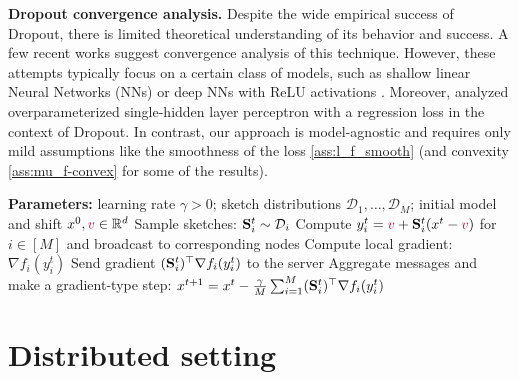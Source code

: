 \documentclass{article}
\newcommand{\shift}{{\color{purple}s}}
\newcommand{\bb}{\mathbb}
\newcommand{\R}{\bb R}
\newcommand{\cD}{\mathcal{D}}
\theoremstyle{plain}
\renewcommand{\shift}{{\color{purple}v}}
\newcommand{\mS}{{\bf S}}
\theoremstyle{plain}
\theoremstyle{definition}
\theoremstyle{remark}
\begin{document}
\textbf{Dropout convergence analysis.}
Despite the wide empirical success of Dropout, there is limited theoretical understanding of its behavior and success. A few recent works \citep{mianjy2020convergence} suggest convergence analysis of this technique. However, these attempts typically focus on a certain class of models, such as shallow linear Neural Networks (NNs) \citep{senen2022asymptotic} or deep NNs with ReLU activations \citep{senen2020almost}.
Moreover, \citet{liao2022on} analyzed overparameterized single-hidden layer perceptron with a regression loss in the context of Dropout.
In contrast, our approach is model-agnostic and requires only mild assumptions like the smoothness of the loss \eqref{ass:l_f_smooth} (and convexity \eqref{ass:mu_f-convex} for some of the results).

\begin{algorithm}[tb]
	\begin{algorithmic}[1]
		\caption{Distributed Double Sketched GD} \label{alg:distributed_GD}
		\STATE \textbf{Parameters:} learning rate $\gamma > 0$; sketch distributions $\mathcal{D}_1, \ldots, \mathcal{D}_M$; initial model and shift $x^0, \shift \in \R^d$
		\STATE Sample sketches: $\mS_i^t \sim \cD_i$
		\STATE
		Compute $y_i^t = \shift + \mS_i^t
		(x^t - \shift)$ for $i \in [M]$ and broadcast to corresponding nodes
		\STATE Compute local gradient: $\nabla f_i(y_i^t)$
		\STATE Send gradient $(\mS_i^t)^\top \nabla f_i(y_i^t)$ to the server
		\ENDFOR
		\STATE Aggregate messages and make a gradient-type step: $x^{t+1} = x^t - \frac{\gamma}{M} \sum_{i=1}^M (\mS_i^t)^\top \nabla f_i(y_i^t)$
		\ENDFOR
	\end{algorithmic}
\end{algorithm}

\section{Distributed setting} \label{sec:distributed}
\end{document}
